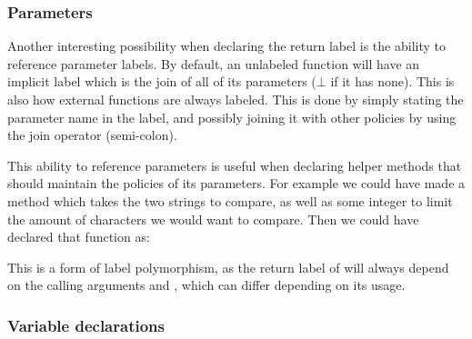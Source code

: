 \subsubsection{Parameters}
Another interesting possibility when declaring the return label is the ability to reference parameter labels.
By default, an unlabeled function will have an implicit label which is the join of all of its parameters ($\bot$ if it has none).
This is also how external functions are always labeled.
This is done by simply stating the parameter name in the label, and possibly joining it with other policies by using the join operator (semi-colon).

This ability to reference parameters is useful when declaring helper methods that should maintain the policies of its parameters.
For example we could have made a  method which takes the two strings to compare, as well as some integer to limit the amount of characters we would want to compare.
Then we could have declared that function as: \\
\begin{minipage}{\linewidth}
  \centering
\end{minipage}

This is a form of label polymorphism, as the return label of  will always depend on the calling arguments  and , which can differ depending on its usage.

\subsubsection{Variable declarations}
